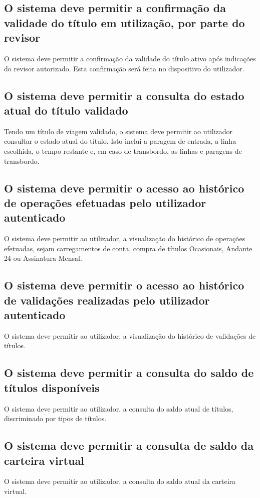 \subsection{O sistema deve permitir a confirmação da validade do título em utilização, por parte do revisor}
O sistema deve permitir a confirmação da validade do título ativo após indicações do revisor autorizado. Esta confirmação será feita no dispositivo do utilizador.

\subsection{O sistema deve permitir a consulta do estado atual do título validado}
Tendo um título de viagem validado, o sistema deve permitir ao utilizador consultar o estado atual do título. Isto inclui a paragem de entrada, a linha escolhida, o tempo restante e, em caso de transbordo, as linhas e paragens de transbordo.

\subsection{O sistema deve permitir o acesso ao histórico de operações efetuadas pelo utilizador autenticado}
O sistema deve permitir ao utilizador, a visualização do histórico de operações efetuadas, sejam carregamentos de conta, compra de títulos Ocasionais, Andante 24 ou Assinatura Mensal.

\subsection{O sistema deve permitir o acesso ao histórico de validações realizadas pelo utilizador autenticado}
O sistema deve permitir ao utilizador, a visualização do histórico de validações de títulos.

\subsection{O sistema deve permitir a consulta do saldo de títulos disponíveis}
O sistema deve permitir ao utilizador, a consulta do saldo atual de títulos, discriminado por tipos de títulos.

\subsection{O sistema deve permitir a consulta de saldo da carteira virtual}
O sistema deve permitir ao utilizador, a consulta do saldo atual da carteira virtual.

